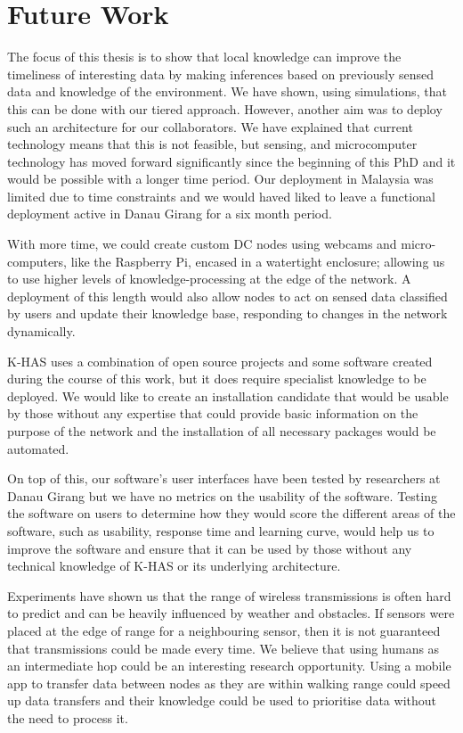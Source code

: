 \section{Future Work}
The focus of this thesis is to show that local knowledge can improve the timeliness of interesting data by making inferences based on previously sensed data and knowledge of the environment. We have shown, using simulations, that this can be done with our tiered approach. However, another aim was to deploy such an architecture for our collaborators. We have explained that current technology means that this is not feasible, but sensing, and microcomputer technology has moved forward significantly since the beginning of this PhD and it would be possible with a longer time period. Our deployment in Malaysia was limited due to time constraints and we would haved liked to leave a functional deployment active in Danau Girang for a six month period. 

With more time, we could create custom DC nodes using webcams and micro-computers, like the Raspberry Pi, encased in a watertight enclosure; allowing us to use higher levels of knowledge-processing at the edge of the network. A deployment of this length would also allow nodes to act on sensed data classified by users and update their knowledge base, responding to changes in the network dynamically.

K-HAS uses a combination of open source projects and some software created during the course of this work, but it does require specialist knowledge to be deployed. We would like to create an installation candidate that would be usable by those without any expertise that could provide basic information on the purpose of the network and the installation of all necessary packages would be automated.

On top of this, our software's user interfaces have been tested by researchers at Danau Girang but we have no metrics on the usability of the software. Testing the software on users to determine how they would score the different areas of the software, such as usability, response time and learning curve, would help us to improve the software and ensure that it can be used by those without any technical knowledge of K-HAS or its underlying architecture.

Experiments have shown us that the range of wireless transmissions is often hard to predict and can be heavily influenced by weather and obstacles. If sensors were placed at the edge of range for a neighbouring sensor, then it is not guaranteed that transmissions could be made every time. We believe that using humans as an intermediate hop could be an interesting research opportunity. Using a mobile app to transfer data between nodes as they are within walking range could speed up data transfers and their knowledge could be used to prioritise data without the need to process it.

